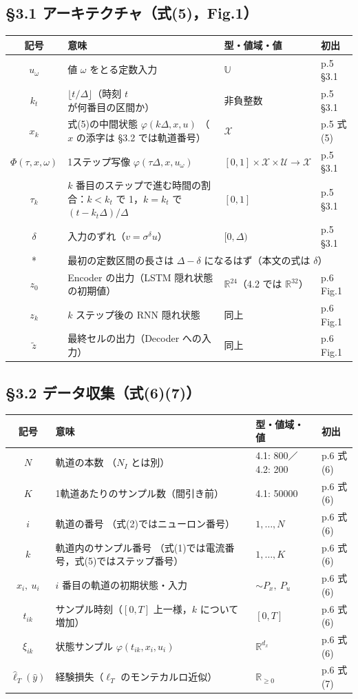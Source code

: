 \documentclass[a4paper,10pt]{ltjsarticle}
\newcommand{\note}[1]{\textcolor{red!70!black}{#1}}
\newenvironment{symtab}{%
  \par\noindent\begin{tabular}{SMTP}
  \toprule
  記号 & 意味 & 型・値域・値 & 初出 \\
  \midrule
}{\bottomrule\end{tabular}\par\medskip}
\begin{document}
\subsection*{§3.1 アーキテクチャ（式(5)，Fig.1）}
\begin{symtab}
$u_\omega$ & 値 $\omega$ をとる定数入力 & $\mathbb{U}$ & p.5 §3.1 \\
$k_t$ & $\lfloor t/\Delta\rfloor$（時刻 $t$ が何番目の区間か） & 非負整数 & p.5 §3.1 \\
$x_k$ & 式(5)の中間状態 $\varphi(k\Delta,x,u)$ \note{（$x$ の添字は §3.2 では軌道番号）} & $\mathcal{X}$ & p.5 式(5) \\
$\Phi(\tau,x,\omega)$ & 1ステップ写像 $\varphi(\tau\Delta,x,u_\omega)$ & $[0,1]\times\mathcal{X}\times\mathcal{U}\to\mathcal{X}$ & p.5 §3.1 \\
$\tau_k$ & $k$ 番目のステップで進む時間の割合：$k<k_t$ で 1，$k=k_t$ で $(t-k_t\Delta)/\Delta$ & $[0,1]$ & p.5 §3.1 \\
$\delta$ & 入力のずれ（$v=\sigma^\delta u$） & $[0,\Delta)$ & p.5 §3.1 \\*
& \multicolumn{3}{l}{\note{最初の定数区間の長さは $\Delta-\delta$ になるはず（本文の式は $\delta$）}} \\
$z_0$ & Encoder の出力（LSTM 隠れ状態の初期値） & $\mathbb{R}^{24}$（4.2 では $\mathbb{R}^{32}$） & p.6 Fig.1 \\
$z_k$ & $k$ ステップ後の RNN 隠れ状態 & 同上 & p.6 Fig.1 \\
$\tilde z$ & 最終セルの出力（Decoder への入力） & 同上 & p.6 Fig.1 \\
\end{symtab}

\subsection*{§3.2 データ収集（式(6)(7)）}
\begin{symtab}
$N$ & 軌道の本数 \note{（$N_I$ とは別）} & 4.1: 800／4.2: 200 & p.6 式(6) \\
$K$ & 1軌道あたりのサンプル数（間引き前） & 4.1: 50000 & p.6 式(6) \\
$i$ & 軌道の番号 \note{（式(2)ではニューロン番号）} & $1,\dots,N$ & p.6 式(6) \\
$k$ & 軌道内のサンプル番号 \note{（式(1)では電流番号，式(5)ではステップ番号）} & $1,\dots,K$ & p.6 式(6) \\
$x_i,\ u_i$ & $i$ 番目の軌道の初期状態・入力 & $\sim P_x,\ P_u$ & p.6 式(6) \\
$t_{ik}$ & サンプル時刻（$[0,T]$ 上一様，$k$ について増加） & $[0,T]$ & p.6 式(6) \\
$\xi_{ik}$ & 状態サンプル $\varphi(t_{ik},x_i,u_i)$ & $\mathbb{R}^{d_x}$ & p.6 式(6) \\
$\hat\ell_T(\hat y)$ & 経験損失（$\ell_T$ のモンテカルロ近似） & $\mathbb{R}_{\ge0}$ & p.6 式(7) \\
\end{symtab}
\end{document}
